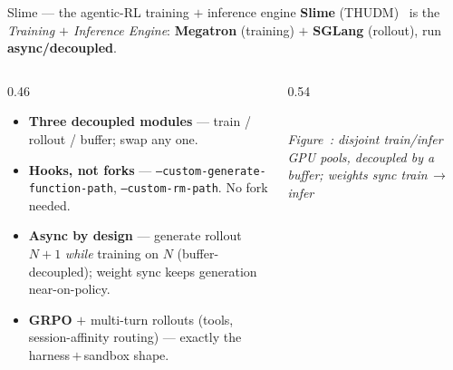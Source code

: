 \documentclass[aspectratio=169]{beamer}
\newcounter{deckfig}
\newcommand{\figtag}[1]{\refstepcounter{deckfig}%
  {\scriptsize\itshape Figure~\thedeckfig: #1}}
\begin{document}
\begin{frame}{Slime --- the agentic-RL training $+$ inference engine}
  \footnotesize \textbf{Slime} (THUDM)~\cite{slime,slime-docs} is the \emph{Training $+$ Inference Engine}:
  \textbf{Megatron} (training) $+$ \textbf{SGLang} (rollout), run \textbf{async/decoupled}.
  \vspace{0.2em}
  \begin{columns}[T]
    \begin{column}{0.46\textwidth}
      \begin{itemize}\setlength\itemsep{0.35em}
        \item \textbf{Three decoupled modules} --- train / rollout / buffer; swap any one.
        \item \textbf{Hooks, not forks} --- \texttt{--custom-generate-function-path},
          \texttt{--custom-rm-path}. No fork needed.
        \item \textbf{Async by design} --- generate rollout $N{+}1$ \emph{while} training on $N$
          (buffer-decoupled); weight sync keeps generation near-on-policy.
        \item \textbf{GRPO} $+$ multi-turn rollouts (tools, session-affinity routing) --- exactly
          the harness\,$+$\,sandbox shape.
      \end{itemize}
    \end{column}
    \begin{column}{0.54\textwidth}
      \centering
      \\[0.3em]\figtag{disjoint train/infer GPU pools, decoupled by a buffer; weights sync train\,$\to$\,infer}
    \end{column}
  \end{columns}
\end{frame}
\end{document}
